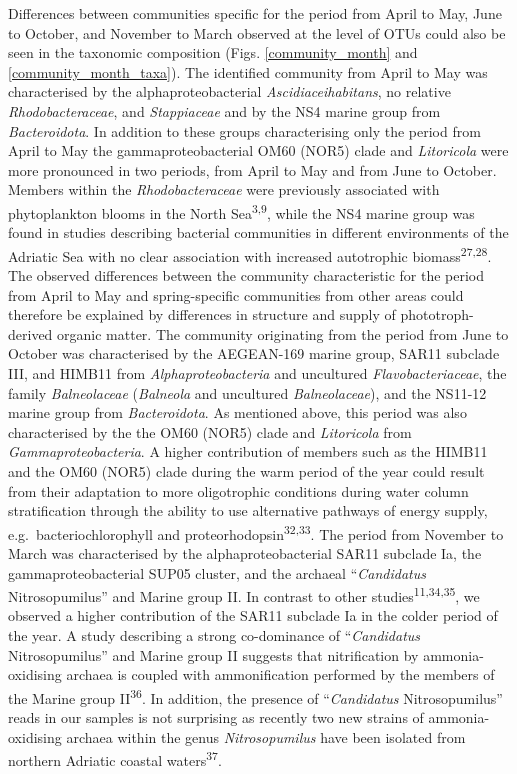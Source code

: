 \documentclass[
  12pt,
]{article}
\begin{document}
Differences between communities specific for the period from April to
May, June to October, and November to March observed at the level of
OTUs could also be seen in the taxonomic composition (Figs.
\ref{community_month} and \ref{community_month_taxa}). The identified
community from April to May was characterised by the
alphaproteobacterial \emph{Ascidiaceihabitans}, no relative
\emph{Rhodobacteraceae}, and \emph{Stappiaceae} and by the NS4 marine
group from \emph{Bacteroidota}. In addition to these groups
characterising only the period from April to May the
gammaproteobacterial OM60 (NOR5) clade and \emph{Litoricola} were more
pronounced in two periods, from April to May and from June to October.
Members within the \emph{Rhodobacteraceae} were previously associated
with phytoplankton blooms in the North Sea\textsuperscript{3,9}, while
the NS4 marine group was found in studies describing bacterial
communities in different environments of the Adriatic Sea with no clear
association with increased autotrophic biomass\textsuperscript{27,28}.
The observed differences between the community characteristic for the
period from April to May and spring-specific communities from other
areas could therefore be explained by differences in structure and
supply of phototroph-derived organic matter. The community originating
from the period from June to October was characterised by the AEGEAN-169
marine group, SAR11 subclade III, and HIMB11 from
\emph{Alphaproteobacteria} and uncultured \emph{Flavobacteriaceae}, the
family \emph{Balneolaceae} (\emph{Balneola} and uncultured
\emph{Balneolaceae}), and the NS11-12 marine group from
\emph{Bacteroidota}. As mentioned above, this period was also
characterised by the the OM60 (NOR5) clade and \emph{Litoricola} from
\emph{Gammaproteobacteria}. A higher contribution of members such as the
HIMB11 and the OM60 (NOR5) clade during the warm period of the year
could result from their adaptation to more oligotrophic conditions
during water column stratification through the ability to use
alternative pathways of energy supply, e.g.~bacteriochlorophyll and
proteorhodopsin\textsuperscript{32,33}. The period from November to
March was characterised by the alphaproteobacterial SAR11 subclade Ia,
the gammaproteobacterial SUP05 cluster, and the archaeal
``\emph{Candidatus} Nitrosopumilus'' and Marine group II. In contrast to
other studies\textsuperscript{11,34,35}, we observed a higher
contribution of the SAR11 subclade Ia in the colder period of the year.
A study describing a strong co-dominance of ``\emph{Candidatus}
Nitrosopumilus'' and Marine group II suggests that nitrification by
ammonia-oxidising archaea is coupled with ammonification performed by
the members of the Marine group II\textsuperscript{36}. In addition, the
presence of ``\emph{Candidatus} Nitrosopumilus'' reads in our samples is
not surprising as recently two new strains of ammonia-oxidising archaea
within the genus \emph{Nitrosopumilus} have been isolated from northern
Adriatic coastal waters\textsuperscript{37}.
\end{document}
